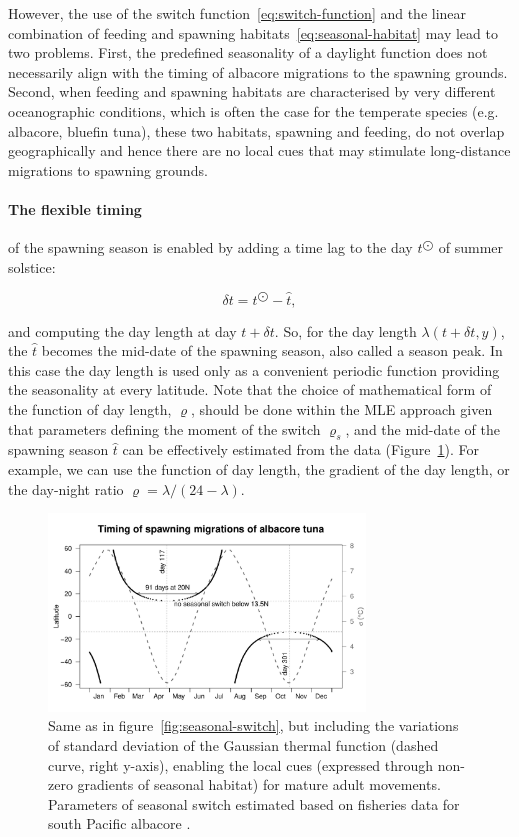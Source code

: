 However, the use of the switch function~\eqref{eq:switch-function} and the linear combination of feeding and spawning habitats~\eqref{eq:seasonal-habitat} may lead to two problems. First, the predefined seasonality of a daylight function does not necessarily align with the timing of albacore migrations to the spawning grounds. Second, when feeding and spawning habitats are characterised by very different oceanographic conditions, which is often the case for the temperate species (e.g. albacore, bluefin tuna), these two habitats, spawning and feeding, do not overlap geographically and hence there are no local cues that may stimulate long-distance migrations to spawning grounds. 

\paragraph{The flexible timing} of the spawning season is enabled by adding a time lag to the day $t^{\bigodot}$ of summer solstice:

\begin{equation}
\delta t=t^{\bigodot}-\hat{t},
\label{eq:season-peak}
\end{equation}

 
\noindent and computing the day length at day $t+\delta t$. So, for the day length $\lambda(t + \delta t,y)$, the $\hat{t}$ becomes the mid-date of the spawning season, also called a season peak. In this case the day length is used only as a convenient periodic function providing the seasonality at every latitude. Note that the choice of mathematical form of the function of day length, $\varrho$, should be done within the MLE approach given that parameters defining the moment of the switch $\varrho_s$, and the mid-date of the spawning season $\hat{t}$ can be effectively estimated from the data (Figure~\ref{fig:seasonal-switch-sigma}). For example, we can use the function of day length, the gradient of the day length, or the day-night ratio $\varrho=\lambda/(24-\lambda)$.


\begin{figure}[htbp]
  \centering
  \includegraphics[width=0.75\textwidth]{chapter1/figs/seasonal_with_sigma}
  \caption{Same as in figure~\ref{fig:seasonal-switch}, but including the variations of standard deviation of the Gaussian thermal function (dashed curve, right y-axis), enabling the local cues (expressed through non-zero gradients of seasonal habitat) for mature adult movements. Parameters of seasonal switch estimated based on fisheries data for south Pacific albacore \citep{Senina2020a}.}
  \label{fig:seasonal-switch-sigma}
\end{figure}

